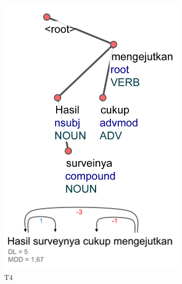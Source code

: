 \begin{figure}
\centering

\begin{subfigure}{.32\linewidth}
  \centering
  \includegraphics[width=1\linewidth] {pics/ts662.jpg} 
	\caption{T4}
	\label{fig:ts662} 
\end{subfigure}
%
\begin{subfigure}{.3\linewidth}
  \centering

\end{subfigure}
\end{figure}
